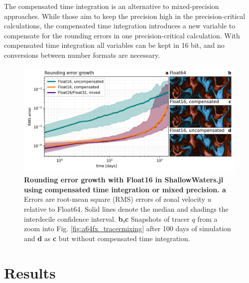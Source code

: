 The compensated time integration is an alternative to mixed-precision approaches. While those aim to keep the precision
high in the precision-critical calculations, the compensated time integration introduces a new variable to compensate for
the rounding errors in one precision-critical calculation. With compensated time integration all variables can be kept in 16 bit,
and no conversions between number formats are necessary.

\begin{figure}[tbhp]
	\includegraphics[width=1\textwidth]{Figures/a64fx/error_growth.png}
	\caption{\textbf{Rounding error growth with Float16 in ShallowWaters.jl
	using compensated time integration or mixed precision. a}
	Errors are root-mean square (RMS) errors of zonal velocity $u$ relative to Float64. Solid lines denote the median
	and shadings the interdecile confidence interval. \textbf{b,c} Snapshots of tracer $q$ from a zoom into
	Fig. \ref{fig:a64fx_tracermixing} after 100 days of simulation and \textbf{d} as \textbf{c} but without
	compensated time integration.}
	\label{fig:a64fx_error_growth}
\end{figure}

\section{Results}
\label{sec:hardware_speedup}

